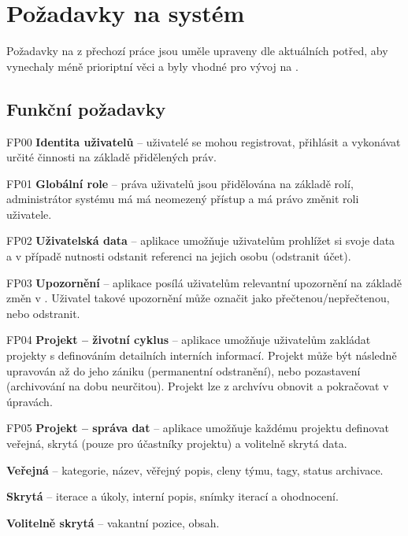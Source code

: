 \section{Požadavky na systém}

Požadavky na  z přechozí práce jsou uměle upraveny dle aktuálních potřed, aby vynechaly méně prioriptní věci a byly vhodné pro vývoj na .



\subsection{Funkční požadavky}

\begin{dl}
   \item[FP00] \textbf{Identita uživatelů} – uživatelé se mohou registrovat, přihlásit a vykonávat určité činnosti na základě přidělených práv.
   \item[FP01] \textbf{Globální role} – práva uživatelů jsou přidělována na základě rolí, administrátor systému má má neomezený přístup a má právo změnit roli uživatele.
   \item[FP02] \textbf{Uživatelská data} – aplikace umožňuje uživatelům prohlížet si svoje data a v případě nutnosti odstanit referenci na jejich osobu (odstranit účet).
   \item[FP03] \textbf{Upozornění} – aplikace posílá uživatelům relevantní upozornění na základě změn v .
   Uživatel takové upozornění může označit jako přečtenou/nepřečtenou, nebo odstranit.
   \item[FP04] \textbf{Projekt – životní cyklus} – aplikace umožňuje uživatelům zakládat projekty s definováním detailních interních informací.
   Projekt může být následně upravován až do jeho zániku (permanentní odstranění), nebo pozastavení (archivování na dobu neurčitou).
   Projekt lze z archvívu obnovit a pokračovat v úpravách.
   \item[FP05] \textbf{Projekt – správa dat} – aplikace umožňuje každému projektu definovat veřejná, skrytá (pouze pro účastníky projektu) a volitelně skrytá data.
   \begin{ul}
      \item {\textbf{Veřejná} – kategorie, název, věřejný popis, cleny týmu, tagy, status archivace.}
      \item {\textbf{Skrytá} – iterace a úkoly, interní popis, snímky iterací a ohodnocení.}
      \item {\textbf{Volitelně skrytá} – vakantní pozice, obsah.}

\end{ul}
\end{dl}
